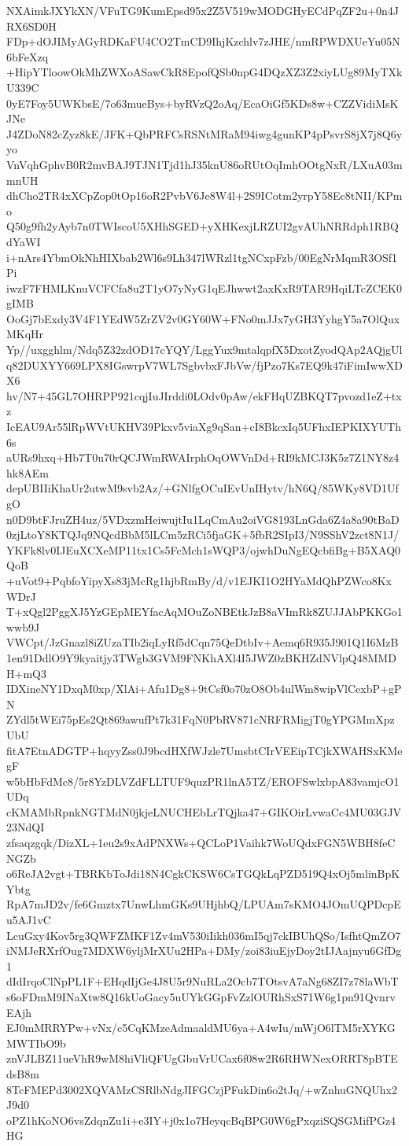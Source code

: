 NXAimkJXYkXN/VFuTG9KumEpsd95x2Z5V519wMODGHyECdPqZF2u+0n4JRX6SD0H
FDp+dOJIMyAGyRDKaFU4CO2TmCD9IhjKzchlv7zJHE/nmRPWDXUeYu05N6bFeXzq
+HipYTloowOkMhZWXoASawCkR8EpofQSb0npG4DQzXZ3Z2xiyLUg89MyTXkU339C
0yE7Foy5UWKbsE/7o63mueBys+byRVzQ2oAq/EcaOiGf5KDs8w+CZZVidiMsKJNe
J4ZDoN82cZyz8kE/JFK+QbPRFCsRSNtMRaM94iwg4gunKP4pPsvrS8jX7j8Q6yyo
VnVqhGphvB0R2mvBAJ9TJN1Tjd1hJ35knU86oRUtOqImhOOtgNxR/LXuA03mmnUH
dhCho2TR4xXCpZop0tOp16oR2PvbV6Je8W4l+2S9ICotm2yrpY58Ec8tNII/KPmo
Q50g9fh2yAyb7n0TWIscoU5XHhSGED+yXHKexjLRZUI2gvAUhNRRdph1RBQdYaWI
i+nArs4YbmOkNhHIXbab2Wl6s9Lh347lWRzl1tgNCxpFzb/00EgNrMqmR3OSf1Pi
iwzF7FHMLKnuVCFCfa8u2T1yO7yNyG1qEJhwwt2axKxR9TAR9HqiLTcZCEK0gIMB
OoGj7bExdy3V4F1YEdW5ZrZV2v0GY60W+FNo0mJJx7yGH3YyhgY5a7OlQuxMKqHr
Yp//uxgghlm/Ndq5Z32zdOD17cYQY/LggYux9mtalqpfX5DxotZyodQAp2AQjgUl
q82DUXYY669LPX8IGswrpV7WL7SgbvbxFJbVw/fjPzo7Ks7EQ9k47iFimIwwXDX6
hv/N7+45GL7OHRPP921cqjIuJIrddi0LOdv0pAw/ekFHqUZBKQT7pvozd1eZ+txz
IcEAU9Ar55lRpWVtUKHV39Pkxv5viaXg9qSan+cI8BkcxIq5UFhxIEPKIXYUTh6s
aURs9hxq+Hb7T0u70rQCJWmRWAIrphOqOWVnDd+RI9kMCJ3K5z7Z1NY8z4hk8AEm
depUBIIiKhaUr2utwM9svb2Az/+GNlfgOCuIEvUnIHytv/hN6Q/85WKy8VD1UfgO
n0D9btFJruZH4uz/5VDxzmHeiwujtIu1LqCmAu2oiVG8193LnGda6Z4a8a90tBaD
0zjLtoY8KTQJq9NQcdBbM5lLCm5zRCi5fjaGK+5fbR2SIpI3/N9SShV2zct8N1J/
YKFk8lv0IJEuXCXeMP11tx1Cs5FcMch1sWQP3/ojwhDuNgEQcbfiBg+B5XAQ0QoB
+uVot9+PqbfoYipyXs83jMcRg1hjbRmBy/d/v1EJKI1O2HYaMdQhPZWco8KxWDrJ
T+xQgl2PggXJ5YzGEpMEYfacAqMOuZoNBEtkJzB8aVImRk8ZUJJAbPKKGo1wwb9J
VWCpt/JzGnazl8iZUzaTIb2iqLyRf5dCqn75QeDtbIv+Aemq6R935J901Q1I6MzB
1en91DdlO9Y9kyaitjy3TWgb3GVM9FNKhAXl4I5JWZ0zBKHZdNVlpQ48MMDH+mQ3
IDXineNY1DxqM0xp/XlAi+Afu1Dg8+9tCsf0o70zO8Ob4ulWm8wipVlCexbP+gPN
ZYdl5tWEi75pEs2Qt869awufPt7k31FqN0PbRV871cNRFRMigjT0gYPGMmXpzUbU
fitA7EtnADGTP+hqyyZss0J9bcdHXfWJzle7UmsbtCIrVEEipTCjkXWAHSxKMegF
w5bHbFdMc8/5r8YzDLVZdFLLTUF9quzPR1lnA5TZ/EROFSwlxbpA83vamjcO1UDq
cKMAMbRpnkNGTMdN0jkjeLNUCHEbLrTQjka47+GIKOirLvwaCc4MU03GJV23NdQI
zfsaqzgqk/DizXL+1eu2s9xAdPNXWs+QCLoP1Vaihk7WoUQdxFGN5WBH8feCNGZb
o6ReJA2vgt+TBRKbToJdi18N4CgkCKSW6CsTGQkLqPZD519Q4xOj5mlinBpKYbtg
RpA7mJD2v/fe6Gmztx7UnwLhmGKs9UHjhbQ/LPUAm7sKMO4JOmUQPDcpEu5AJ1vC
LcuGxy4Kov5rg3QWFZMKF1Zv4mV530iIikh036mI5qj7ckIBUhQSo/IsfhtQmZO7
iNMJeRXrfOug7MDXW6yljMrXUu2HPa+DMy/zoi83iuEjyDoy2tIJAajnyu6GfDg1
dIdIrqoClNpPL1F+EHqdIjGe4J8U5r9NuRLa2Ocb7TOtsvA7aNg68ZI7z78laWbT
s6oFDmM9INaXtw8Q16kUoGacy5uUYkGGpFvZzlOURhSxS71W6g1pn91QvnrvEAjh
EJ0mMRRYPw+vNx/c5CqKMzeAdmaaldMU6ya+A4wIu/mWjO6lTM5rXYKGMWTIbO9b
znVJLBZ11ueVhR9wM8hiVliQFUgGbuVrUCax6f08w2R6RHWNexORRT8pBTEdsB8m
8TcFMEPd3002XQVAMzCSRlbNdgJIFGCzjPFukDin6o2tJq/+wZnhuGNQUhx2J9d0
oPZ1hKoNO6vsZdqnZu1i+e3IY+j0x1o7HeyqcBqBPG0W6gPxqziSQSGMifPGz4HG
